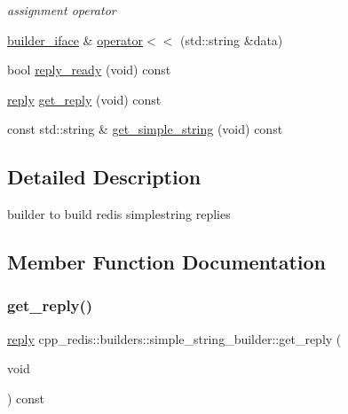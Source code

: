 \begin{DoxyCompactItemize}
\begin{DoxyCompactList}\small\item\em assignment operator \end{DoxyCompactList}\item 
\hyperlink{classcpp__redis_1_1builders_1_1builder__iface}{builder\+\_\+iface} \& \hyperlink{classcpp__redis_1_1builders_1_1simple__string__builder_a159bb512f0427c4a988742f7cd01035e}{operator$<$$<$} (std\+::string \&data)
\item 
bool \hyperlink{classcpp__redis_1_1builders_1_1simple__string__builder_ad586164caf02b3022b91789cac23a72d}{reply\+\_\+ready} (void) const
\item 
\hyperlink{classcpp__redis_1_1reply}{reply} \hyperlink{classcpp__redis_1_1builders_1_1simple__string__builder_a24ad0968d7d02172a65cf8982c540d51}{get\+\_\+reply} (void) const
\item 
const std\+::string \& \hyperlink{classcpp__redis_1_1builders_1_1simple__string__builder_a539ba8a9234269e57471f1973adc58c2}{get\+\_\+simple\+\_\+string} (void) const
\end{DoxyCompactItemize}


\subsection{Detailed Description}
builder to build redis simplestring replies 

\subsection{Member Function Documentation}
\mbox{\label{classcpp__redis_1_1builders_1_1simple__string__builder_a24ad0968d7d02172a65cf8982c540d51}} 
\subsubsection{\texorpdfstring{get\+\_\+reply()}{get\_reply()}}
{\footnotesize\ttfamily \hyperlink{classcpp__redis_1_1reply}{reply} cpp\+\_\+redis\+::builders\+::simple\+\_\+string\+\_\+builder\+::get\+\_\+reply (\begin{DoxyParamCaption}\item[{void}]{ }\end{DoxyParamCaption}) const\hspace{0.3cm}{\ttfamily [virtual]}}

